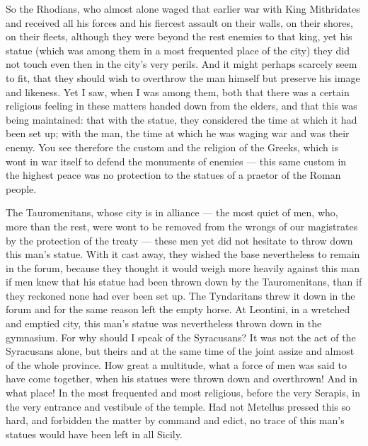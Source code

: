 So the Rhodians, who almost alone waged that earlier war with King Mithridates and received all his forces and his fiercest assault on their walls, on their shores, on their fleets, although they were beyond the rest enemies to that king, yet his statue (which was among them in a most frequented place of the city) they did not touch even then in the city's very perils. And it might perhaps scarcely seem to fit, that they should wish to overthrow the man himself but preserve his image and likeness. Yet I saw, when I was among them, both that there was a certain religious feeling in these matters handed down from the elders, and that this was being maintained: that with the statue, they considered the time at which it had been set up; with the man, the time at which he was waging war and was their enemy. You see therefore the custom and the religion of the Greeks, which is wont in war itself to defend the monuments of enemies --- this same custom in the highest peace was no protection to the statues of a praetor of the Roman people.

 The Tauromenitans, whose city is in alliance --- the most quiet of men, who, more than the rest, were wont to be removed from the wrongs of our magistrates by the protection of the treaty --- these men yet did not hesitate to throw down this man's statue. With it cast away, they wished the base nevertheless to remain in the forum, because they thought it would weigh more heavily against this man if men knew that his statue had been thrown down by the Tauromenitans, than if they reckoned none had ever been set up. The Tyndaritans threw it down in the forum and for the same reason left the empty horse. At Leontini, in a wretched and emptied city, this man's statue was nevertheless thrown down in the gymnasium. For why should I speak of the Syracusans? It was not the act of the Syracusans alone, but theirs and at the same time of the joint assize and almost of the whole province. How great a multitude, what a force of men was said to have come together, when his statues were thrown down and overthrown! And in what place! In the most frequented and most religious, before the very Serapis, in the very entrance and vestibule of the temple. Had not Metellus pressed this so hard, and forbidden the matter by command and edict, no trace of this man's statues would have been left in all Sicily.


